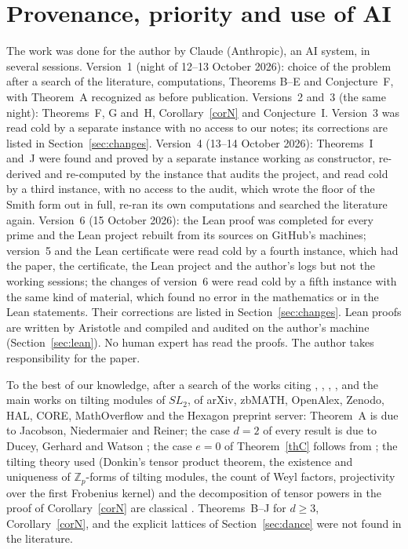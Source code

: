 \documentclass[10pt]{article}
\theoremstyle{ds}
\theoremstyle{dsrem}
\newcommand{\Z}{\mathbb{Z}}
\begin{document}
\section*{Provenance, priority and use of AI}\label{sec:prov}
The work was done for the author by Claude (Anthropic), an AI system, in several sessions. Version~1 (night of 12--13 October 2026): choice of the problem after a search of the literature, computations, Theorems B--E and Conjecture~F, with Theorem~A recognized as \cite[Theorem~13]{JNR} before publication. Versions~2 and~3 (the same night): Theorems~F, G and~H, Corollary~\ref{corN} and Conjecture~I. Version~3 was read cold by a separate instance with no access to our notes; its corrections are listed in Section~\ref{sec:changes}. Version~4 (13--14 October 2026): Theorems~I and~J were found and proved by a separate instance working as constructor, re-derived and re-computed by the instance that audits the project, and read cold by a third instance, with no access to the audit, which wrote the floor of the Smith form out in full, re-ran its own computations and searched the literature again. Version~6 (15 October 2026): the Lean proof was completed for every prime and the Lean project rebuilt from its sources on GitHub's machines; version~5 and the Lean certificate were read cold by a fourth instance, which had the paper, the certificate, the Lean project and the author's logs but not the working sessions; the changes of version~6 were read cold by a fifth instance with the same kind of material, which found no error in the mathematics or in the Lean statements. Their corrections are listed in Section~\ref{sec:changes}. Lean proofs are written by Aristotle \cite{Har} and compiled and audited on the author's machine (Section~\ref{sec:lean}). No human expert has read the proofs. The author takes responsibility for the paper.

To the best of our knowledge, after a search of the works citing \cite{JNR}, \cite{DGW}, \cite{DJ}, \cite{CSX}, \cite{Bai} and the main works on tilting modules of $SL_2$, of arXiv, zbMATH, OpenAlex, Zenodo, HAL, CORE, MathOverflow and the Hexagon preprint server: Theorem~A is due to Jacobson, Niedermaier and Reiner; the case $d=2$ of every result is due to Ducey, Gerhard and Watson \cite{DGW}; the case $e=0$ of Theorem~\ref{thC} follows from \cite[Theorem~2]{JNR}; the tilting theory used (Donkin's tensor product theorem, the existence and uniqueness of $\Z_p$-forms of tilting modules, the count of Weyl factors, projectivity over the first Frobenius kernel) and the decomposition of tensor powers in the proof of Corollary~\ref{corN} are classical \cite{Don,Jan,And}. Theorems~B--J for $d\ge3$, Corollary~\ref{corN}, and the explicit lattices of Section~\ref{sec:dance} were not found in the literature.
\end{document}
